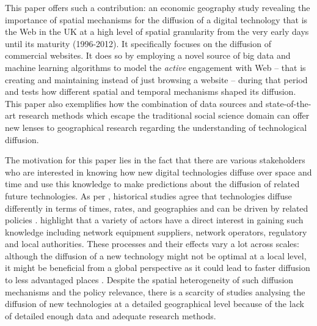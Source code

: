 \documentclass[
  authoryear,
  preprint,
  3p]{elsarticle}
\begin{document}
This paper offers such a contribution: an economic geography study
revealing the importance of spatial mechanisms for the diffusion of a
digital technology that is the Web in the UK at a high level of spatial
granularity from the very early days until its maturity (1996-2012). It
specifically focuses on the diffusion of commercial websites. It does so
by employing a novel source of big data and machine learning algorithms
to model the \emph{active} engagement with Web -- that is creating and
maintaining instead of just browsing a website -- during that period and
tests how different spatial and temporal mechanisms shaped its
diffusion. This paper also exemplifies how the combination of data
sources and state-of-the-art research methods which escape the
traditional social science domain can offer new lenses to geographical
research regarding the understanding of technological diffusion.

The motivation for this paper lies in the fact that there are various
stakeholders who are interested in knowing how new digital technologies
diffuse over space and time and use this knowledge to make predictions
about the diffusion of related future technologies. As per
\citet{leibowicz2016representing}, historical studies agree that
technologies diffuse differently in terms of times, rates, and
geographies and can be driven by related policies \citep{victor1993}.
\citet{meade2021modelling} highlight that a variety of actors have a
direct interest in gaining such knowledge including network equipment
suppliers, network operators, regulatory and local authorities. These
processes and their effects vary a lot across scales: although the
diffusion of a new technology might not be optimal at a local level, it
might be beneficial from a global perspective as it could lead to faster
diffusion to less advantaged places \citep{leibowicz2016representing}.
Despite the spatial heterogeneity of such diffusion mechanisms and the
policy relevance, there is a scarcity of studies analysing the diffusion
of new technologies at a detailed geographical level because of the lack
of detailed enough data and adequate research methods.
\end{document}
